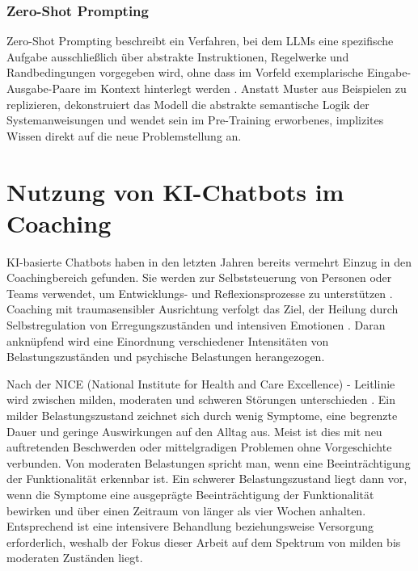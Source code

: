 \subsubsection{Zero-Shot Prompting}
Zero-Shot Prompting beschreibt ein Verfahren, bei dem LLMs eine spezifische Aufgabe ausschließlich über abstrakte Instruktionen, Regelwerke und Randbedingungen vorgegeben wird, ohne dass im Vorfeld exemplarische Eingabe-Ausgabe-Paare im Kontext hinterlegt werden \citep{brown2020language,ronanki2024requirements}. Anstatt Muster aus Beispielen zu replizieren, dekonstruiert das Modell die abstrakte semantische Logik der Systemanweisungen und wendet sein im Pre-Training erworbenes, implizites Wissen direkt auf die neue Problemstellung an.


\section{Nutzung von KI-Chatbots im Coaching}
KI-basierte Chatbots haben in den letzten Jahren bereits vermehrt Einzug in den Coachingbereich gefunden. Sie werden zur Selbststeuerung von Personen oder Teams verwendet, um Entwicklungs- und Reflexionsprozesse zu unterstützen \citep{mai2020ai}. Coaching mit traumasensibler Ausrichtung verfolgt das Ziel, der Heilung durch Selbstregulation von Erregungszuständen und intensiven Emotionen \citep{Levine2010}. Daran anknüpfend wird eine Einordnung verschiedener Intensitäten von Belastungszuständen und psychische Belastungen herangezogen. 

Nach der NICE (National Institute for Health and Care Excellence) - Leitlinie wird zwischen milden, moderaten und schweren Störungen unterschieden \citep{kendrick2012common}. Ein milder Belastungszustand zeichnet sich durch wenig Symptome, eine begrenzte Dauer und geringe Auswirkungen auf den Alltag aus. Meist ist dies mit neu auftretenden Beschwerden oder mittelgradigen Problemen ohne Vorgeschichte verbunden. Von moderaten Belastungen spricht man, wenn eine Beeinträchtigung der Funktionalität erkennbar ist. Ein schwerer Belastungszustand liegt dann vor, wenn die Symptome eine ausgeprägte Beeinträchtigung der Funktionalität bewirken und über einen Zeitraum von länger als vier Wochen anhalten. Entsprechend ist eine intensivere Behandlung beziehungsweise Versorgung erforderlich, weshalb der Fokus dieser Arbeit auf dem Spektrum von milden bis moderaten Zuständen liegt.

